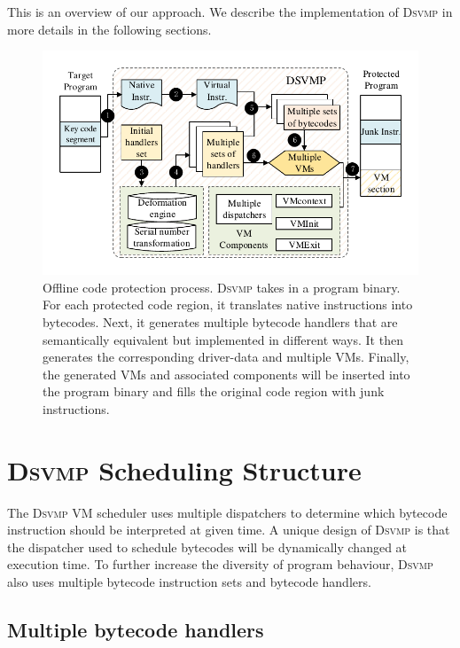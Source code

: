 \documentclass[conference]{IEEEtran}
\newcommand{\DSVMP}{\textsc{Dsvmp}\xspace}
\begin{document}
This is an overview of our approach. We describe the implementation of \DSVMP in more details in the following sections.
\begin{figure}[t]
  \centering
  \includegraphics[width=1.0\columnwidth]{figure/figtwo.pdf}
  \caption{Offline code protection process. \DSVMP takes in a program binary. For each protected code region, it translates native instructions into bytecodes. Next, it generates multiple bytecode handlers that are semantically equivalent but implemented in different ways. It then generates the corresponding driver-data and multiple VMs. Finally, the generated VMs and associated components will be inserted into the program binary and fills the original code region with junk instructions.}\label{fig:Fig.2}
  \vspace{-5mm}
\end{figure}



\section{\DSVMP Scheduling Structure \label{sec:dvs}}

The \DSVMP VM scheduler uses multiple dispatchers to determine which bytecode instruction should be interpreted at given time.
A unique design of \DSVMP is that the dispatcher used to schedule bytecodes will be dynamically changed at execution time. To further increase the diversity of program behaviour, \DSVMP also uses multiple bytecode instruction sets and bytecode handlers.

\subsection{Multiple bytecode handlers \label{sec:mb}}
\end{document}

